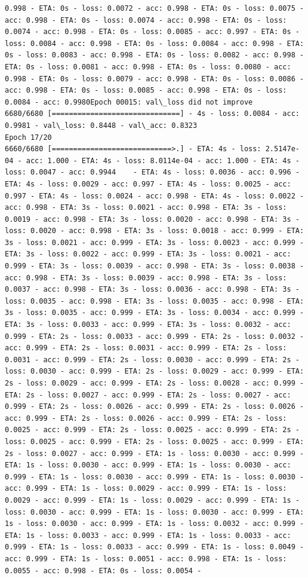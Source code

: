 \documentclass[11pt]{article}
\begin{document}
\begin{Verbatim}[commandchars=\\\{\}]
0.998 - ETA: 0s - loss: 0.0072 - acc: 0.998 - ETA: 0s - loss: 0.0075 - acc: 0.998 - ETA: 0s - loss: 0.0074 - acc: 0.998 - ETA: 0s - loss: 0.0074 - acc: 0.998 - ETA: 0s - loss: 0.0085 - acc: 0.997 - ETA: 0s - loss: 0.0084 - acc: 0.998 - ETA: 0s - loss: 0.0084 - acc: 0.998 - ETA: 0s - loss: 0.0083 - acc: 0.998 - ETA: 0s - loss: 0.0082 - acc: 0.998 - ETA: 0s - loss: 0.0081 - acc: 0.998 - ETA: 0s - loss: 0.0080 - acc: 0.998 - ETA: 0s - loss: 0.0079 - acc: 0.998 - ETA: 0s - loss: 0.0086 - acc: 0.998 - ETA: 0s - loss: 0.0085 - acc: 0.998 - ETA: 0s - loss: 0.0084 - acc: 0.9980Epoch 00015: val\_loss did not improve
6680/6680 [==============================] - 4s - loss: 0.0084 - acc: 0.9981 - val\_loss: 0.8448 - val\_acc: 0.8323
Epoch 17/20
6660/6680 [============================>.] - ETA: 4s - loss: 2.5147e-04 - acc: 1.000 - ETA: 4s - loss: 8.0114e-04 - acc: 1.000 - ETA: 4s - loss: 0.0047 - acc: 0.9944    - ETA: 4s - loss: 0.0036 - acc: 0.996 - ETA: 4s - loss: 0.0029 - acc: 0.997 - ETA: 4s - loss: 0.0025 - acc: 0.997 - ETA: 4s - loss: 0.0024 - acc: 0.998 - ETA: 4s - loss: 0.0022 - acc: 0.998 - ETA: 3s - loss: 0.0021 - acc: 0.998 - ETA: 3s - loss: 0.0019 - acc: 0.998 - ETA: 3s - loss: 0.0020 - acc: 0.998 - ETA: 3s - loss: 0.0020 - acc: 0.998 - ETA: 3s - loss: 0.0018 - acc: 0.999 - ETA: 3s - loss: 0.0021 - acc: 0.999 - ETA: 3s - loss: 0.0023 - acc: 0.999 - ETA: 3s - loss: 0.0022 - acc: 0.999 - ETA: 3s - loss: 0.0021 - acc: 0.999 - ETA: 3s - loss: 0.0039 - acc: 0.998 - ETA: 3s - loss: 0.0038 - acc: 0.998 - ETA: 3s - loss: 0.0039 - acc: 0.998 - ETA: 3s - loss: 0.0037 - acc: 0.998 - ETA: 3s - loss: 0.0036 - acc: 0.998 - ETA: 3s - loss: 0.0035 - acc: 0.998 - ETA: 3s - loss: 0.0035 - acc: 0.998 - ETA: 3s - loss: 0.0035 - acc: 0.999 - ETA: 3s - loss: 0.0034 - acc: 0.999 - ETA: 3s - loss: 0.0033 - acc: 0.999 - ETA: 3s - loss: 0.0032 - acc: 0.999 - ETA: 2s - loss: 0.0033 - acc: 0.999 - ETA: 2s - loss: 0.0032 - acc: 0.999 - ETA: 2s - loss: 0.0031 - acc: 0.999 - ETA: 2s - loss: 0.0031 - acc: 0.999 - ETA: 2s - loss: 0.0030 - acc: 0.999 - ETA: 2s - loss: 0.0030 - acc: 0.999 - ETA: 2s - loss: 0.0029 - acc: 0.999 - ETA: 2s - loss: 0.0029 - acc: 0.999 - ETA: 2s - loss: 0.0028 - acc: 0.999 - ETA: 2s - loss: 0.0027 - acc: 0.999 - ETA: 2s - loss: 0.0027 - acc: 0.999 - ETA: 2s - loss: 0.0026 - acc: 0.999 - ETA: 2s - loss: 0.0026 - acc: 0.999 - ETA: 2s - loss: 0.0026 - acc: 0.999 - ETA: 2s - loss: 0.0025 - acc: 0.999 - ETA: 2s - loss: 0.0025 - acc: 0.999 - ETA: 2s - loss: 0.0025 - acc: 0.999 - ETA: 2s - loss: 0.0025 - acc: 0.999 - ETA: 2s - loss: 0.0027 - acc: 0.999 - ETA: 1s - loss: 0.0030 - acc: 0.999 - ETA: 1s - loss: 0.0030 - acc: 0.999 - ETA: 1s - loss: 0.0030 - acc: 0.999 - ETA: 1s - loss: 0.0030 - acc: 0.999 - ETA: 1s - loss: 0.0030 - acc: 0.999 - ETA: 1s - loss: 0.0029 - acc: 0.999 - ETA: 1s - loss: 0.0029 - acc: 0.999 - ETA: 1s - loss: 0.0029 - acc: 0.999 - ETA: 1s - loss: 0.0030 - acc: 0.999 - ETA: 1s - loss: 0.0030 - acc: 0.999 - ETA: 1s - loss: 0.0030 - acc: 0.999 - ETA: 1s - loss: 0.0032 - acc: 0.999 - ETA: 1s - loss: 0.0033 - acc: 0.999 - ETA: 1s - loss: 0.0033 - acc: 0.999 - ETA: 1s - loss: 0.0033 - acc: 0.999 - ETA: 1s - loss: 0.0049 - acc: 0.999 - ETA: 1s - loss: 0.0051 - acc: 0.998 - ETA: 1s - loss: 0.0055 - acc: 0.998 - ETA: 0s - loss: 0.0054 - 
\end{Verbatim}
\end{document}
